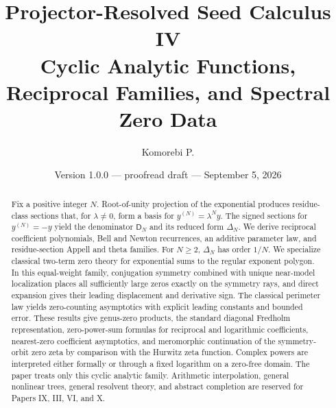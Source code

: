 \documentclass[11pt]{article}
\title{\textbf{Projector-Resolved Seed Calculus IV}\\[0.45em]
\large Cyclic Analytic Functions, Reciprocal Families, and Spectral Zero Data}
\author{Komorebi P.}
\date{Version 1.0.0 --- proofread draft --- September 5, 2026}
\theoremstyle{definition}
\theoremstyle{remark}
\newcommand{\Dfun}{\mathsf D}
\begin{document}
\maketitle
\begin{abstract}
Fix a positive integer $N$. Root-of-unity projection of the exponential
produces residue-class sections that, for $\lambda\ne0$, form a basis for
$y^{(N)}=\lambda^N y$. The signed sections for $y^{(N)}=-y$ yield the
denominator $\Dfun_N$ and its reduced form $\Delta_N$. We derive reciprocal
coefficient polynomials, Bell and Newton recurrences, an additive parameter
law, and residue-section Appell and theta families. For $N\geq2$,
$\Delta_N$ has order $1/N$. We specialize classical two-term zero theory for
exponential sums to the regular exponent polygon. In this equal-weight family,
conjugation symmetry combined with unique near-model localization places all
sufficiently large zeros exactly on the symmetry rays, and direct expansion
gives their leading displacement and derivative sign. The classical perimeter
law yields zero-counting asymptotics with explicit leading constants and
bounded error. These results give genus-zero products, the standard diagonal
Fredholm representation, zero-power-sum formulas for reciprocal and
logarithmic coefficients, nearest-zero coefficient asymptotics, and
meromorphic continuation of the symmetry-orbit zero zeta by comparison with
the Hurwitz zeta function. Complex powers are interpreted either formally or
through a fixed logarithm on a zero-free domain. The paper treats only this
cyclic analytic family. Arithmetic interpolation, general nonlinear trees,
general resolvent theory, and abstract completion are reserved for Papers IX,
III, VI, and X.
\end{abstract}

\begin{center}
\end{center}
\end{document}
